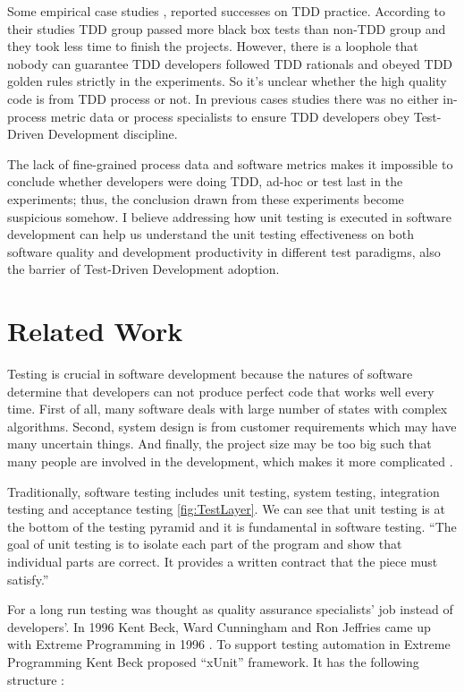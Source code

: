 \documentclass[11pt,twocolumn]{article}
\begin{document}
  Some empirical case studies \cite{George:2003}, \cite{Maximilien:2003}
  reported successes on TDD practice. According to their studies TDD group
  passed more black box tests than non-TDD group and they took less time to
  finish the projects. However, there is a loophole that nobody can
  guarantee TDD developers followed TDD rationals and obeyed TDD golden
  rules strictly in the experiments. So it's unclear whether the high
  quality code is from TDD process or not. In previous cases studies there
  was no either in-process metric data or process specialists to ensure
  TDD developers obey Test-Driven Development discipline.
  
  The lack of fine-grained process data and software metrics makes it
  impossible to conclude whether developers were doing TDD, ad-hoc or test
  last in the experiments; thus, the conclusion drawn from these
  experiments become suspicious somehow. I believe addressing how unit
  testing is executed in software development can help us understand the unit
  testing effectiveness on both software quality and development
  productivity in different test paradigms, also the barrier of Test-Driven
  Development adoption.

\section{Related Work}
\label{sec:relwork}

Testing is crucial in software development because the natures of software
determine that developers can not produce perfect code that works well
every time. First of all, many software deals with large number of states
with complex algorithms. Second, system design is from customer
requirements which may have many uncertain things. And finally, the project
size may be too big such that many people are involved in the development,
which makes it more complicated \cite{Pfleeger:2001}.

Traditionally, software testing includes unit testing, system testing,
integration testing and acceptance testing \ref{fig:TestLayer}. We can see
that unit testing is at the bottom of the testing pyramid and it is
fundamental in software testing. ``The goal of unit testing is to isolate
each part of the program and show that individual parts are correct. It
provides a written contract that the piece must satisfy.''
\cite{UnitTestWiki} 

For a long run testing was thought as quality assurance specialists' job instead of
developers'. In 1996 Kent Beck, Ward Cunningham and Ron Jeffries came up
with Extreme Programming in 1996 \cite{XP96}. To support testing automation
in Extreme Programming Kent Beck proposed ``xUnit'' framework. It has the
following structure \cite{Beck:2003}:
\end{document}
